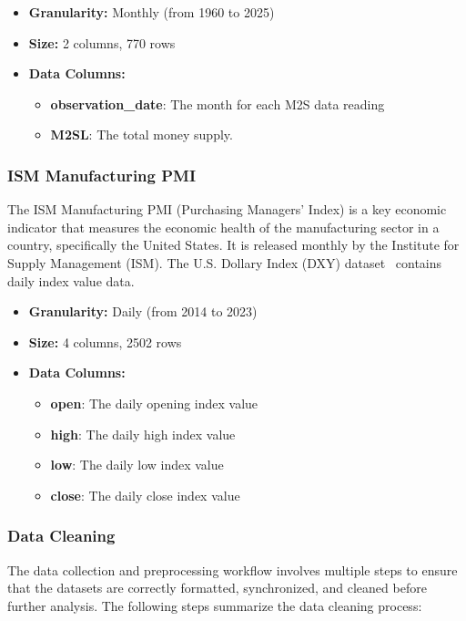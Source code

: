 \begin{itemize}
    \item \textbf{Granularity:} Monthly (from 1960 to 2025)
    \item \textbf{Size:} 2 columns, 770 rows
    \item \textbf{Data Columns:}
    \begin{itemize}
        \item \textbf{observation\_date}: The month for each M2S data reading
        \item \textbf{M2SL}: The total money supply.
    \end{itemize}
\end{itemize}

\subsubsection{ISM Manufacturing PMI}\label{ism_manufacturing_pmi}

The ISM Manufacturing PMI (Purchasing Managers' Index) is a key economic indicator that measures the economic health of
the manufacturing sector in a country, specifically the United States. It is released monthly by the Institute for Supply
Management (ISM). The U.S. Dollary Index (DXY) dataset\ \cite{dxyData} contains daily index value data.

\begin{itemize}
    \item \textbf{Granularity:} Daily (from 2014 to 2023)
    \item \textbf{Size:} 4 columns, 2502 rows
    \item \textbf{Data Columns:}
    \begin{itemize}
        \item \textbf{open}: The daily opening index value
        \item \textbf{high}: The daily high index value
        \item \textbf{low}: The daily low index value
        \item \textbf{close}: The daily close index value
    \end{itemize}
\end{itemize}

\subsubsection{Data Cleaning}\label{sec:data_cleaning}

The data collection and preprocessing workflow involves multiple steps to ensure that the datasets are correctly
formatted, synchronized, and cleaned before further analysis. The following steps summarize the data cleaning process:

